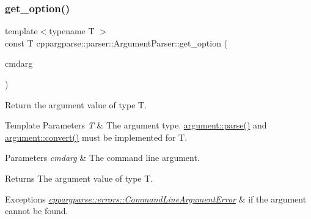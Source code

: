 \subsubsection{\texorpdfstring{get\+\_\+option()}{get\_option()}\hspace{0.1cm}{\footnotesize\ttfamily [1/2]}}
{\footnotesize\ttfamily template$<$typename T $>$ \\
const T cppargparse\+::parser\+::\+Argument\+Parser\+::get\+\_\+option (\begin{DoxyParamCaption}\item[{const \hyperlink{structcppargparse_1_1types_1_1CommandLineArgument__t}{types\+::\+Command\+Line\+Argument\+\_\+t} \&}]{cmdarg }\end{DoxyParamCaption})\hspace{0.3cm}{\ttfamily [inline]}}



Return the argument value of type T. 


\begin{DoxyTemplParams}{Template Parameters}
{\em T} & The argument type. \hyperlink{structcppargparse_1_1argument_a9b5feac6fe8cf18beb63d85c0840cd84}{argument\+::parse()} and \hyperlink{structcppargparse_1_1argument_a2051f71ef4ed0b9d299cc58bb494e42b}{argument\+::convert()} must be implemented for T.\\
\hline
\end{DoxyTemplParams}

\begin{DoxyParams}{Parameters}
{\em cmdarg} & The command line argument.\\
\hline
\end{DoxyParams}
\begin{DoxyReturn}{Returns}
The argument value of type T. 
\end{DoxyReturn}

\begin{DoxyExceptions}{Exceptions}
{\em \hyperlink{classcppargparse_1_1errors_1_1CommandLineArgumentError}{cppargparse\+::errors\+::\+Command\+Line\+Argument\+Error}} & if the argument cannot be found. \\
\hline
\end{DoxyExceptions}
\mbox{\label{classcppargparse_1_1parser_1_1ArgumentParser_ae74d77501679cce38a72e6fa1534e64a}} 

